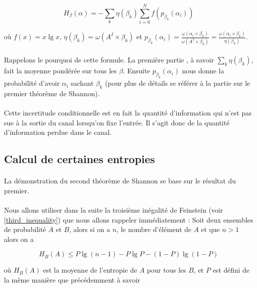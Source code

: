 	\[
		H_\beta(\alpha) =
		- \sum_k\eta(\beta_k)\sum_{i=0}^Nf(p_{\beta_k}(\alpha_i))
	\]
	
	où $f(x) = x \lg x$, $\eta(\beta_k) = \omega(A^I \times \beta_k)$
	et 
		$p_{\beta_k}(\alpha_i) = 
		\frac{\omega(\alpha_i \times \beta_k)}{\omega(A^I \times \beta_k)}=
		\frac{\omega(\alpha_i \times \beta_k)}{\eta(\beta_k)}$.
	\paragraph{}
	Rappelons le pourquoi de cette formule. La première partie , à savoir
	$\sum_k\eta(\beta_k)$, fait la moyenne pondérée sur tous les $\beta$.
	Ensuite $p_{\beta_k}(\alpha_i)$ nous donne la probabilité d'avoir 
	$\alpha_i$ sachant $\beta_k$ (pour plus de détails se référer à la partie
	sur le premier théorème de Shannon).
	
	
	
	\paragraph{}
	Cette incertitude conditionnelle est en fait la quantité d'information
	qui n'est pas sue à la sortie du canal lorsqu'on fixe l'entrée. Il 
	s'agit donc de la quantité d'information perdue dans le canal.
	
\subsection*{Calcul de certaines entropies}

	\paragraph{}
	La démonstration du second théorème de Shannon se base sur le 
	résultat du premier. 
	
	\paragraph{}
	Nous allons utiliser dans la suite la troisième inégalité de Feinstein 
	(voir \ref{third_inequality}) que nous allons rappeler immédiatement :
	Soit deux ensembles de probabilité $A$ et $B$, alors si on a $n$, le 
	nombre d'élément de $A$ et que $n>1$ alors on a 
	
	\[H_B(A)\le P\lg (n-1) - P\lg P - (1-P)\lg(1-P)\]
	
	
	où $H_B(A)$ est la moyenne de l'entropie de $A$ pour tous
	les $B$, et $P$ est défini de la même manière que précédemment à savoir
	
